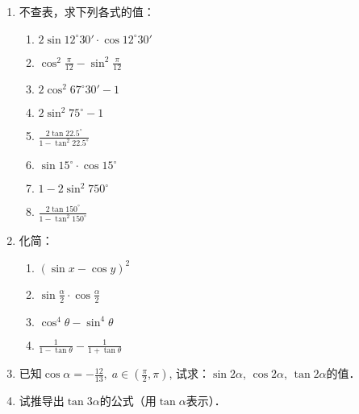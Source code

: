 \begin{ex}
\begin{enumerate}
    \item 不查表，求下列各式的值：
\begin{multicols}{2}
\begin{enumerate}
    \item $2\sin12^{\circ}30'\cdot \cos12^{\circ}30'$
    \item $\cos^2\frac{\pi}{12}-\sin^2\frac{\pi}{12}$
    \item $2\cos^2 67^{\circ}30'-1$
    \item $2\sin^2 75^{\circ}-1$
    \item $\frac{2\tan 22.5^{\circ}}{1-\tan^2 22.5^{\circ}}$
    \item $\sin 15^{\circ}\cdot \cos 15^{\circ}$
    \item $1-2\sin^2 750^{\circ}$
    \item $\frac{2\tan 150^{\circ}}{1-\tan^2 150^{\circ}}$
\end{enumerate}
\end{multicols}
\item 化简：
\begin{multicols}{2}
\begin{enumerate}
    \item $(\sin x-\cos y)^2$
    \item $\sin \frac{\alpha}{2}\cdot\cos\frac{\alpha}{2}$
    \item $\cos^4\theta-\sin^4\theta$
    \item $\frac{1}{1-\tan\theta}-\frac{1}{1+\tan\theta}$
\end{enumerate}
\end{multicols}

\item     已知$\cos\alpha=-\frac{12}{13},\; a\in \left(\frac{\pi}{2},\pi\right)$, 试求：$\sin2\alpha$, $\cos2\alpha$, $\tan2\alpha$的值．

\item 试推导出$\tan3\alpha$的公式（用$\tan\alpha$表示）．


\end{enumerate}
\end{ex}
